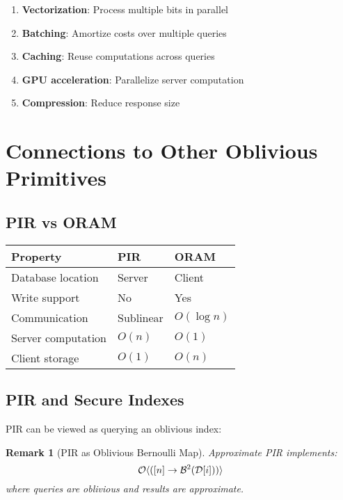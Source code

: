 \documentclass[11pt,final,hidelinks]{article}
\newcommand{\DB}{\mathcal{D}}
\newtheorem{remark}[theorem]{Remark}
\begin{document}
\begin{enumerate}
    \item \textbf{Vectorization}: Process multiple bits in parallel
    \item \textbf{Batching}: Amortize costs over multiple queries
    \item \textbf{Caching}: Reuse computations across queries
    \item \textbf{GPU acceleration}: Parallelize server computation
    \item \textbf{Compression}: Reduce response size
\end{enumerate}

\section{Connections to Other Oblivious Primitives}

\subsection{PIR vs ORAM}

\begin{center}
\begin{tabular}{lll}
\toprule
\textbf{Property} & \textbf{PIR} & \textbf{ORAM} \\
\midrule
Database location & Server & Client \\
Write support & No & Yes \\
Communication & Sublinear & $O(\log n)$ \\
Server computation & $O(n)$ & $O(1)$ \\
Client storage & $O(1)$ & $O(n)$ \\
\bottomrule
\end{tabular}
\end{center}

\subsection{PIR and Secure Indexes}

PIR can be viewed as querying an oblivious index:

\begin{remark}[PIR as Oblivious Bernoulli Map]
Approximate PIR implements:
\begin{equation}
\ObvMap{[n]}{\Bernoulli{\DB[i]}{2}}
\end{equation}
where queries are oblivious and results are approximate.
\end{remark}
\end{document}
